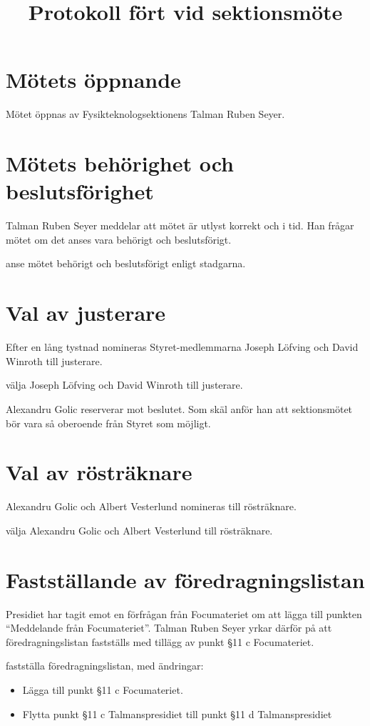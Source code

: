 \documentclass[hidelinks]{../sektionsmote} %
\title{Protokoll fört vid sektionsmöte}
\begin{document}
\maketitle

\section{Mötets öppnande}
Mötet öppnas \tid av Fysikteknologsektionens Talman Ruben Seyer.


\section{Mötets behörighet och beslutsförighet}
Talman Ruben Seyer meddelar att mötet är utlyst korrekt och i tid.
Han frågar mötet om det anses vara behörigt och beslutsförigt.
\begin{beslut}
    \item anse mötet behörigt och beslutsförigt enligt stadgarna.
\end{beslut}


\section{Val av justerare}
Efter en lång tystnad nomineras Styret-medlemmarna Joseph Löfving och David Winroth till justerare.
\begin{beslut}
    \item välja Joseph Löfving och David Winroth till justerare.
\end{beslut}
Alexandru Golic reserverar mot beslutet.
Som skäl anför han att sektionsmötet bör vara så oberoende från Styret som möjligt.


\section{Val av rösträknare}
Alexandru Golic och Albert Vesterlund nomineras till rösträknare.
\begin{beslut}
    \item välja Alexandru Golic och Albert Vesterlund till rösträknare.
\end{beslut}


\section{Fastställande av föredragningslistan}
Presidiet har tagit emot en förfrågan från Focumateriet om att lägga till punkten \enquote{Meddelande från Focumateriet}.
Talman Ruben Seyer yrkar därför på att föredragningslistan fastställs med tillägg av punkt §11 c Focumateriet.
\begin{beslut}
    \item fastställa föredragningslistan, med ändringar: 
    \begin{itemize}
        \item Lägga till punkt §11 c Focumateriet.
        \item Flytta punkt §11 c Talmanspresidiet till punkt §11 d Talmanspresidiet
    \end{itemize}
\end{beslut}
\end{document}
